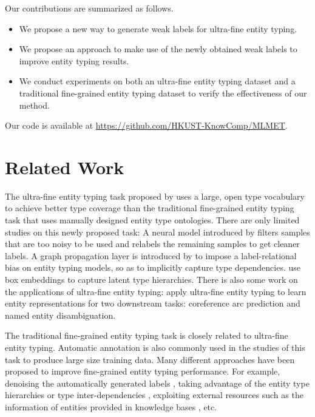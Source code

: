 \documentclass[11pt,a4paper]{article}
\begin{document}
Our contributions are summarized as follows.

\begin{itemize}
\item We propose a new way to generate weak labels {for ultra-fine entity typing}.

\item We propose an approach to make use of the newly obtained weak labels to improve entity typing results.

\item We conduct experiments on both an ultra-fine entity typing dataset and a traditional fine-grained entity typing dataset to verify the effectiveness of our method.

\end{itemize}

Our code is available at \url{https://github.com/HKUST-KnowComp/MLMET}.

\section{Related Work}

The ultra-fine entity typing task proposed by \citet{choi2018ultra} uses a large, open type vocabulary to achieve better type coverage than the traditional fine-grained entity typing task \cite{ling2012fine} that uses manually designed entity type ontologies.
There are only limited studies on this newly proposed task: A neural model introduced by \cite{onoe2019learning} filters samples that are too noisy to be used and relabels the remaining samples to get cleaner labels. A graph propagation layer is introduced by \cite{xiong2019imposing} to impose a label-relational bias on entity typing models, so as to implicitly capture type dependencies. \citet{onoe2021modeling} use box embeddings to capture latent type hierarchies. There is also some work on the applications of ultra-fine entity typing: \citet{onoe2020interpretable} apply ultra-fine entity typing to learn entity representations for two downstream tasks: coreference arc prediction and named entity disambiguation.

The traditional fine-grained entity typing task \cite{ling2012fine,yosef2012hyena} is closely related to ultra-fine entity typing. Automatic annotation \cite{ling2012fine,gillick2014context,dai2020exploiting} is also commonly used in the studies of this task to produce large size training data. 
Many different approaches have been proposed to improve fine-grained entity typing performance. For example, denoising the automatically generated labels \cite{ren2016label}, taking advantage of the entity type hierarchies or type inter-dependencies \cite{chen2020hierarchical,murty2018hierarchical,lin2019attentive}, exploiting external resources such as the information of entities provided in knowledge bases \cite{jin2019fine,dai2019improving,xin2018improving}, etc.
\end{document}
